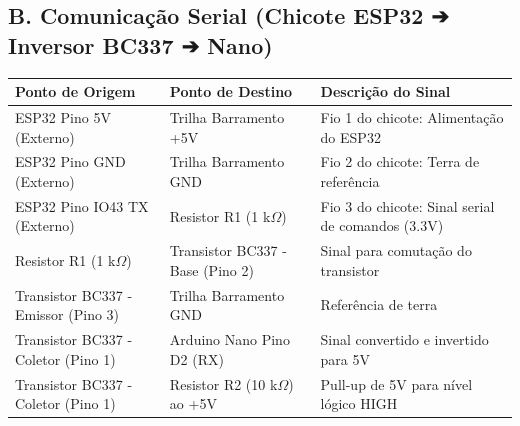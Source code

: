 \documentclass[11pt,a4paper]{article}
\begin{document}
\subsection{B. Comunicação Serial (Chicote ESP32 ➔ Inversor BC337 ➔ Nano)}
\begin{table}[h!]
\centering
\small
\begin{tabularx}{\textwidth}{p{4.5cm} p{5.5cm} X}
\toprule
\rowcolor{tablehead} \color{white}\textbf{Ponto de Origem} & \color{white}\textbf{Ponto de Destino} & \color{white}\textbf{Descrição do Sinal} \\
\midrule
ESP32 Pino 5V (Externo) & Trilha Barramento +5V & Fio 1 do chicote: Alimentação do ESP32 \\
\rowcolor{tablezebra} ESP32 Pino GND (Externo) & Trilha Barramento GND & Fio 2 do chicote: Terra de referência \\
ESP32 Pino IO43 TX (Externo) & Resistor R1 (1 k$\Omega$) & Fio 3 do chicote: Sinal serial de comandos (3.3V) \\
\rowcolor{tablezebra} Resistor R1 (1 k$\Omega$) & Transistor BC337 - Base (Pino 2) & Sinal para comutação do transistor \\
Transistor BC337 - Emissor (Pino 3) & Trilha Barramento GND & Referência de terra \\
\rowcolor{tablezebra} Transistor BC337 - Coletor (Pino 1) & Arduino Nano Pino D2 (RX) & Sinal convertido e invertido para 5V \\
Transistor BC337 - Coletor (Pino 1) & Resistor R2 (10 k$\Omega$) ao +5V & Pull-up de 5V para nível lógico HIGH \\
\bottomrule
\end{tabularx}
\end{table}
\end{document}
